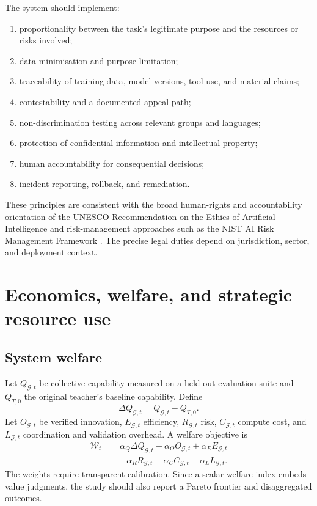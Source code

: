 \documentclass[11pt,a4paper]{article}
\begin{document}
The system should implement:
\begin{enumerate}
\item proportionality between the task's legitimate purpose and the resources or risks involved;
\item data minimisation and purpose limitation;
\item traceability of training data, model versions, tool use, and material claims;
\item contestability and a documented appeal path;
\item non-discrimination testing across relevant groups and languages;
\item protection of confidential information and intellectual property;
\item human accountability for consequential decisions;
\item incident reporting, rollback, and remediation.
\end{enumerate}
These principles are consistent with the broad human-rights and accountability orientation of the UNESCO Recommendation on the Ethics of Artificial Intelligence \cite{unesco2021} and risk-management approaches such as the NIST AI Risk Management Framework \cite{nist2023}. The precise legal duties depend on jurisdiction, sector, and deployment context.

\section{Economics, welfare, and strategic resource use}

\subsection{System welfare}

Let \(Q_{\mathcal G,t}\) be collective capability measured on a held-out evaluation suite and \(Q_{T,0}\) the original teacher's baseline capability. Define
\begin{equation}
\Delta Q_{\mathcal G,t}=Q_{\mathcal G,t}-Q_{T,0}.
\end{equation}
Let \(O_{\mathcal G,t}\) be verified innovation, \(E_{\mathcal G,t}\) efficiency, \(R_{\mathcal G,t}\) risk, \(C_{\mathcal G,t}\) compute cost, and \(L_{\mathcal G,t}\) coordination and validation overhead. A welfare objective is
\begin{align}
\mathcal W_t={}&
\alpha_Q\Delta Q_{\mathcal G,t}
+\alpha_O O_{\mathcal G,t}
+\alpha_E E_{\mathcal G,t}\\
&-\alpha_R R_{\mathcal G,t}
-\alpha_C C_{\mathcal G,t}
-\alpha_L L_{\mathcal G,t}.
\end{align}
The weights require transparent calibration. Since a scalar welfare index embeds value judgments, the study should also report a Pareto frontier and disaggregated outcomes.
\end{document}
